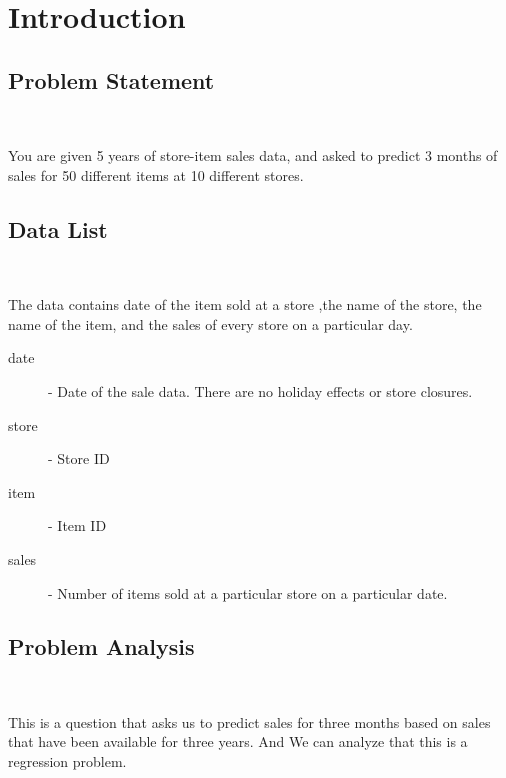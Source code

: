 \section{Introduction}\label{sec-intro}





\subsection{Problem Statement}
\

You are given 5 years of store-item sales data, and asked to predict 3 months of sales 
for 50 different items at 10 different stores.
\subsection{Data List}
\

The data contains date of the item sold at a store ,the name of the store, the name of the item,
and the sales of every store on a particular day.
\begin{description}
  \item [date] - Date of the sale data. There are no holiday effects or store closures.
  \item [store] - Store ID
  \item [item] - Item ID
  \item [sales] - Number of items sold at a particular store on a particular date.
\end{description}

\subsection{Problem Analysis}
\

This is a question that asks us to predict sales for three months
 based on sales that have been available for three years. And We can
 analyze that this is a regression problem.

